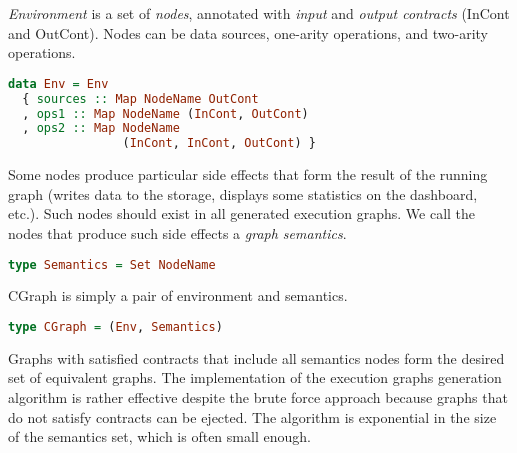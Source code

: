 {\em Environment} is a set of {\em nodes}, annotated with {\em input} and {\em output contracts} (InCont and OutCont).
Nodes can be data sources, one-arity operations, and two-arity operations.

\begin{lstlisting}[language=Haskell]
data Env = Env
  { sources :: Map NodeName OutCont
  , ops1 :: Map NodeName (InCont, OutCont)
  , ops2 :: Map NodeName
                (InCont, InCont, OutCont) }
\end{lstlisting}

Some nodes produce particular side effects that form the result of the running graph (writes data to the storage, displays some statistics on the dashboard, etc.).
Such nodes should exist in all generated execution graphs.
We call the nodes that produce such side effects a {\em graph semantics}.

\begin{lstlisting}[language=Haskell]
type Semantics = Set NodeName
\end{lstlisting}

CGraph is simply a pair of environment and semantics.

\begin{lstlisting}[language=Haskell]
type CGraph = (Env, Semantics)
\end{lstlisting}

Graphs with satisfied contracts that include all semantics nodes form the desired set of equivalent graphs. The implementation of the execution graphs generation algorithm is rather effective despite the brute force approach because graphs that do not satisfy contracts can be ejected. The algorithm is exponential in the size of the semantics set, which is often small enough.




